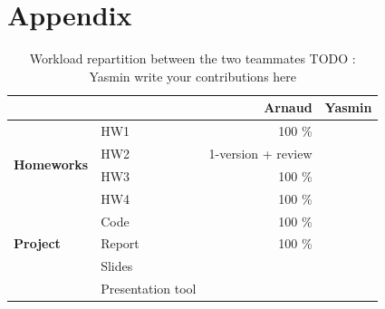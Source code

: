 \documentclass[a4paper,10pt]{article}
\begin{document}
\section{Appendix}
\FloatBarrier
\begin{table}
  \centering
  \begin{tabular}{llrr} \toprule
                                        &                   & \textbf{Arnaud}    & \textbf{Yasmin} \\ \midrule
    \multirow{4}{*}{\textbf{Homeworks}} & HW1               & 100 \%             &                 \\
                                        & HW2               & 1-version + review &                 \\
                                        & HW3               & 100 \%             &                 \\
                                        & HW4               & 100 \%             &                 \\ \cmidrule{2-4}
    \multirow{3}{*}{\textbf{Project}}   & Code              & 100 \%             &                 \\
                                        & Report            & 100 \%             &                 \\
                                        & Slides            &                    &                 \\
                                        & Presentation tool &                    &                 \\
    \bottomrule
  \end{tabular}
  \caption{ Workload repartition between the two teammates \color{red} TODO : Yasmin write your contributions here}
  \label{tab:nodes}
\end{table}
\end{document}
